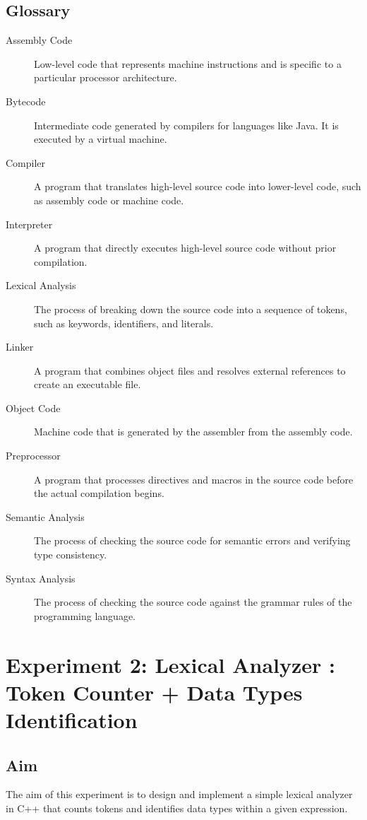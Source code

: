 \documentclass[12pt]{article}
\begin{document}
\subsection*{Glossary}
\begin{description}
    \item[Assembly Code] Low-level code that represents machine instructions and is specific to a particular processor architecture.
    \item[Bytecode] Intermediate code generated by compilers for languages like Java. It is executed by a virtual machine.
    \item[Compiler] A program that translates high-level source code into lower-level code, such as assembly code or machine code.
    \item[Interpreter] A program that directly executes high-level source code without prior compilation.
    \item[Lexical Analysis] The process of breaking down the source code into a sequence of tokens, such as keywords, identifiers, and literals.
    \item[Linker] A program that combines object files and resolves external references to create an executable file.
    \item[Object Code] Machine code that is generated by the assembler from the assembly code.
    \item[Preprocessor] A program that processes directives and macros in the source code before the actual compilation begins.
    \item[Semantic Analysis] The process of checking the source code for semantic errors and verifying type consistency.
    \item[Syntax Analysis] The process of checking the source code against the grammar rules of the programming language.
\end{description}


\newpage
\section*{Experiment 2: Lexical Analyzer : Token Counter + Data Types Identification}

\subsection*{Aim}
The aim of this experiment is to design and implement a simple lexical analyzer in C++ that counts tokens and identifies data types within a given expression.
\end{document}
